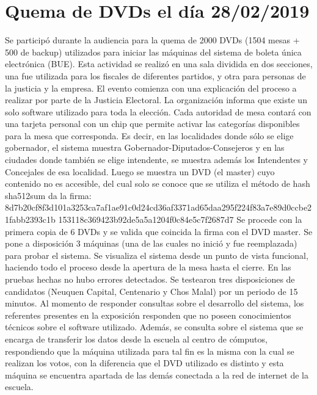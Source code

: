 \section{Quema de DVDs el día 28/02/2019}
Se participó durante la audiencia para la quema de 2000 DVDs (1504 mesas + 500 de backup) utilizados para iniciar las máquinas del sistema de boleta única electrónica (BUE). \newline
Esta actividad se realizó en una sala dividida en dos secciones, una fue utilizada para los fiscales de diferentes partidos, y otra para personas de la justicia y la empresa.  \newline
El evento comienza con una explicación del proceso a realizar por parte de la Justicia Electoral.  La organización informa que existe un solo software utilizado para toda la elección. Cada autoridad de mesa contará con una tarjeta personal con un chip que permite activar las categorías disponibles para la mesa que corresponda. Es decir, en las localidades donde sólo se elige gobernador, el sistema muestra Gobernador-Diputados-Consejeros y en las ciudades donde también se elige intendente, se muestra además los Intendentes y Concejales de esa localidad. \newline
Luego se muestra un DVD (el master) cuyo contenido no es accesible, del cual solo se conoce que se utiliza el método de hash sha512sum da la firma: \newline
8d7b20cf8f3d101a3253ca7af1ae91c0d24cd36af3371ad65daa295f224f83a7e89d0ccbe21fabb2393c1b \newline 153118c369423b92de5a5a1204f0c84e5c7f2687d7  \newline
Se procede con la primera copia de 6 DVDs y se valida que coincida la firma con el DVD master.  
Se pone a disposición 3 máquinas (una de las cuales no inició y fue reemplazada) para probar el sistema. Se visualiza el sistema desde un punto de vista funcional, haciendo todo el proceso desde la apertura de la mesa hasta el cierre. En las pruebas hechas no hubo errores detectados. Se testearon tres disposiciones de candidatos (Neuquen Capital, Centenario y Chos Malal) por un periodo de 15 minutos. 
Al momento de responder consultas sobre el desarrollo del sistema, los referentes presentes en la exposición responden que no poseen conocimientos técnicos sobre el software utilizado. Además, se consulta sobre el sistema que se encarga de transferir los datos desde la escuela al centro de cómputos, respondiendo que la máquina utilizada para tal fin es la misma con la cual se realizan los votos, con la diferencia que el DVD utilizado es distinto y esta máquina se encuentra apartada de las demás conectada a la red de internet de la escuela. \newline
